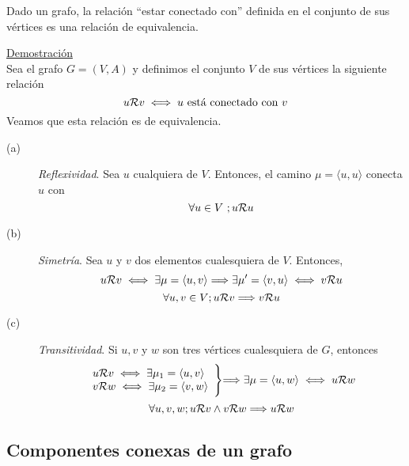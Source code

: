 \begin{fondo}
Dado un grafo, la relación ``estar conectado con'' definida en el conjunto de sus vértices es una relación de equivalencia.
\end{fondo}

\underline{Demostración}\\

Sea el grafo $G = (V,A)$ y definimos el conjunto $V$ de sus vértices la siguiente relación
\[ u {\cal{R}} v \iff u\ \mbox{está conectado con}\ v\]
Veamos que esta relación es de equivalencia.\\
\begin{description}
\item[(a)]\emph{Reflexividad}. Sea $u$ cualquiera de $V$. Entonces, el camino $\mu = \langle u, u \rangle$ conecta $u$ con \\ \hspace*{-.1in}{$u$, luego}
\[ \forall u \in V\ ; u {\cal{R}} u \]
\hspace*{-.1in}{es decir $\cal R$ es reflexiva.}
\item[(b)]\emph{Simetría}. Sea $u$ y $v$ dos elementos cualesquiera de $V$. Entonces,
\[ u {\cal{R}} v \iff \exists \mu = \langle u, v \rangle \Longrightarrow \exists \mu' = \langle v, u \rangle \iff v {\cal{R}} u \]
\hspace*{-.1in}{luego,}
\[ \forall u, v \in V ; u {\cal{R}} v \Longrightarrow v {\cal{R}} u \]
\item[(c)]\emph{Transitividad}. Si $u,v$ y $w$ son tres vértices cualesquiera de $G$, entonces
\[
  \begin{array}{l}
    u {\cal{R}} v \iff \exists \mu_1 = \langle u, v \rangle \\
    v {\cal{R}} w \iff \exists \mu_2 = \langle v, w \rangle \\
  \end{array}
  \Biggl\} \Longrightarrow \exists \mu = \langle u, w \rangle \iff u {\cal{R}} w
\]
\hspace*{-.1in}{Bastaría, pues, con unir los caminos $\mu_1$ y $\mu_2$. Por lo tanto}
\[ \forall u, v, w ; u {\cal{R}} v \land v {\cal{R}} w \Longrightarrow u {\cal{R}} w \]
\end{description}

\subsection{Componentes conexas de un grafo}

